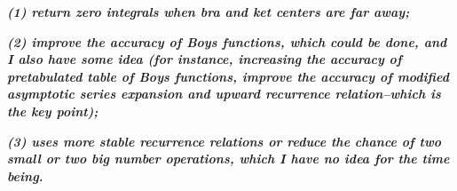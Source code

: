 \documentclass[a4paper,11pt,twoside,openright]{book}
\newcommand{\fixme}[1]{\textbf{\textit{\color{red} #1}}}
\begin{document}
\fixme{(1) return zero integrals when bra and ket centers are far away;}

\fixme{(2) improve the accuracy of Boys functions, which could be done, and I also have some idea (for instance, increasing the accuracy of pretabulated table of Boys functions, improve the accuracy of modified asymptotic series expansion and upward recurrence relation--which is the key point);}

\fixme{(3) uses more stable recurrence relations or reduce the chance of two small or two big number operations, which I have no idea for the time being.}

\backmatter

\begin{small}
  
%  
  
\end{small}

\printindex
\end{document}

